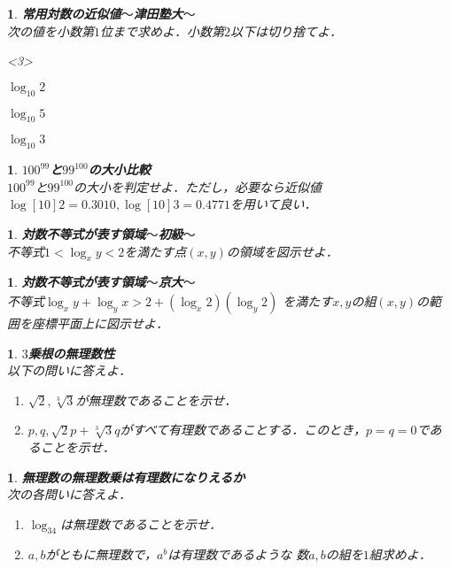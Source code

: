 \documentclass[10pt,
fleqn,
dvipdfmx,
uplatex
]{jsarticle}
\newtheorem{question}[Question]{}
\begin{document}
\begin{question}{\bf\boldmath 常用対数の近似値$〜$津田塾大$〜$}\\
次の値を小数第$1$位まで求めよ．小数第$2$以下は切り捨てよ．
\begin{edaenumerate}<3>
\item $\log _{10}2$
\item $\log _{10}5$
\item $\log _{10}3$
\end{edaenumerate}

\end{question}



\begin{question}{\bf\boldmath $100^{99}$と$99^{100}$の大小比較}\\
${100}^{99}$と${99}^{100}$の大小を判定せよ．ただし，必要なら近似値$\log [{10}]2=0.{3010}, \log [{10}]3=0.{4771}$を用いて良い．
\end{question}



\begin{question}{\bf\boldmath 対数不等式が表す領域$〜$初級$〜$}\\
不等式$1<\log _xy<2$を満たす点$\left(x,y\right)$の領域を図示せよ．
\end{question}



\begin{question}{\bf\boldmath 対数不等式が表す領域$〜$京大$〜$}\\
不等式$\log _xy+\log _yx>2+\left(\log _x2\right)\left(\log _y2\right)$
を満たす$x, y$の組$\left(x,y\right)$の範囲を座標平面上に図示せよ．
\end{question}



\begin{question}{\bf\boldmath $3$乗根の無理数性}\\
以下の問いに答えよ．
\begin{enumerate}
\item $\sqrt 2, \sqrt[3]3$が無理数であることを示せ．
\item $p, q, \sqrt 2p+\sqrt[3]3q$がすべて有理数であることする．このとき，$p=q=0$であることを示せ．
\end{enumerate}

\end{question}



\begin{question}{\bf\boldmath 無理数の無理数乗は有理数になりえるか}\\
次の各問いに答えよ．
\begin{enumerate}
\item $\log _34$は無理数であることを示せ．
\item $a, b$がともに無理数で，$a^b$は有理数であるような
数$a, b$の組を$1$組求めよ．
\end{enumerate}

\end{question}
\end{document}

